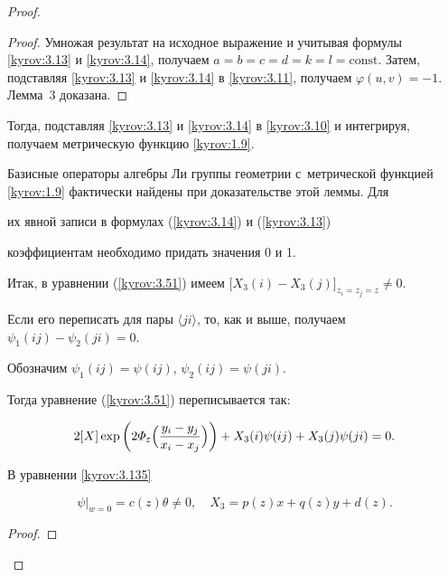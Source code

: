\begin{proof}
\begin{proof}
Умножая результат на исходное выражение и учитывая формулы \eqref{kyrov:3.13} и \eqref{kyrov:3.14}, получаем $a = b = c = d = k = l = \text{const}$. Затем, подставляя \eqref{kyrov:3.13} и \eqref{kyrov:3.14}  в \eqref{kyrov:3.11}, получаем $\varphi(u,v) = -1$. Лемма~3 доказана. \end{proof}



\smallskip



Тогда, подставляя \eqref{kyrov:3.13} и \eqref{kyrov:3.14}   в \eqref{kyrov:3.10} и интегрируя, получаем метрическую функцию \eqref{kyrov:1.9}. 

Базисные операторы алгебры Ли группы геометрии с~метрической функцией \eqref{kyrov:1.9} фактически найдены при доказательстве этой леммы. Для

их явной записи в формулах (\ref{kyrov:3.14}) и (\ref{kyrov:3.13})

коэффициентам необходимо придать значения 0 и 1.



Итак, в уравнении (\ref{kyrov:3.51}) имеем $\bigl[X_3(i) - X_3(j)\bigr]_{z_i=z_j=z}\ne0$. 

Если его переписать для пары $\langle ji\rangle$, то, как и выше, получаем  $\psi_1(ij) - \psi_2(ji) = 0$.

Обозначим $\psi_1(ij) = \psi(ij)$, $\psi_2(ij) = \psi(ji)$. 

Тогда уравнение (\ref{kyrov:3.51}) переписывается так:

\begin{equation}

\label{kyrov:3.135}

2[X]\exp\left({2\varPhi_{\varepsilon}\Bigl(\frac{y_i-y_j}{x_i-x_j}\Bigr)}\right) + X_3(i)\psi(ij) + X_3(j)\psi(ji) = 0.

\end{equation}



\begin{lemma}[4]В уравнении \eqref{kyrov:3.135}

$$

\psi\bigr|_{w=0} = c(z)\theta\ne0,\quad X_3 = p(z)x + q(z) y + d(z).

$$

\end{lemma}



\begin{proof}


\end{proof}
\end{proof}
